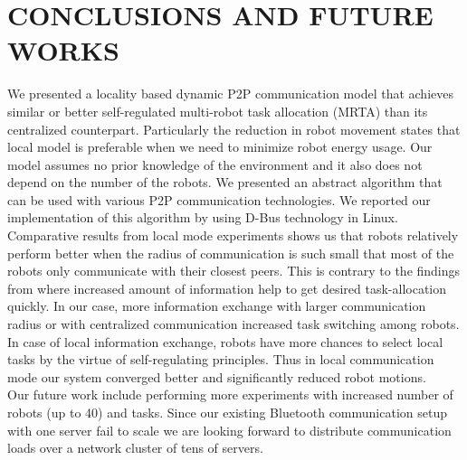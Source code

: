 \documentclass[letterpaper, 10 pt, times, conference]{ieeeconf} %
\begin{document}
\section{CONCLUSIONS AND FUTURE WORKS}
\label{sec:conc}
We presented a locality based dynamic P2P communication model that achieves similar or better self-regulated multi-robot task allocation (MRTA) than its centralized counterpart. Particularly the reduction in robot movement states that local model is preferable when we need to minimize robot energy usage. Our model assumes no prior knowledge of the environment and it also does not depend on the number of the robots. We presented an abstract algorithm that can be used with various P2P communication technologies. We reported our implementation of this algorithm   by using  D-Bus technology in Linux. Comparative results from local mode experiments shows us that robots relatively perform better when the radius of communication is such small that most of the robots only communicate with their closest peers. This is contrary to the findings from \cite{Rutishauser, Epuck} where increased amount of information help to get desired task-allocation quickly. In our case, more information exchange with larger communication radius or with centralized communication increased task switching among robots. In case of local information exchange, robots have more chances to select local tasks by the virtue of self-regulating principles. Thus in local communication mode our system converged better and significantly reduced robot motions.\\ 
Our future work include performing more experiments with increased number of robots (up to 40) and tasks. Since our existing Bluetooth communication setup with one server fail to scale we are looking forward to distribute communication loads over a network cluster of tens of servers.
\end{document}
